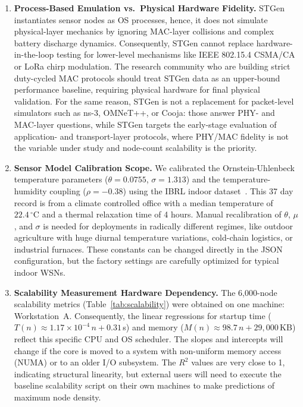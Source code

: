 \documentclass[jsan,article,submit,moreauthors,pdftex]{Definitions/mdpi}
\begin{document}
\begin{enumerate}

\item \textbf{Process-Based Emulation vs.\ Physical Hardware Fidelity.}
STGen instantiates sensor nodes as OS processes, hence, it does not simulate physical-layer mechanics by ignoring MAC-layer collisions and complex battery discharge dynamics. Consequently, STGen cannot replace hardware-in-the-loop testing for lower-level mechanisms like IEEE 802.15.4 CSMA/CA or {LoRa} chirp modulation. The research community who are building strict duty-cycled MAC protocols should treat STGen data as an upper-bound performance baseline, requiring physical hardware for final physical validation. For the same reason, STGen is not a replacement for packet-level simulators such as ns-3, OMNeT++, or Cooja: those answer PHY- and MAC-layer questions, while STGen targets the early-stage evaluation of application- and transport-layer protocols, where PHY/MAC fidelity is not the variable under study and node-count scalability is the priority.


\item \textbf{Sensor Model Calibration Scope.}
We calibrated the Ornstein-Uhlenbeck temperature
parameters ($\theta = 0.0755$, $\sigma = 1.313$) and the temperature-humidity coupling ($\rho = -0.38$) using the IBRL indoor dataset~\cite{intel-berkeley-lab}. This 37 day record is from a climate controlled office with a median temperature of $22.4\,^\circ\text{C}$ and a thermal relaxation time of 4 hours. Manual recalibration of $\theta$, $\mu$, and $\sigma$ is needed for deployments in radically different regimes, like outdoor agriculture with huge diurnal temperature variations, cold-chain logistics, or industrial furnaces. These constants can be changed directly in the JSON configuration, but the factory settings are carefully optimized for typical indoor WSNs.

\item \textbf{Scalability Measurement Hardware Dependency.}
The 6{,}000-node scalability metrics (Table~\ref{tab:scalability}) were obtained on one machine: Workstation~A. Consequently, the linear regressions for startup time ($T(n) \approx 1.17\times10^{-4}\,n + 0.31$\,s) and memory ($M(n) \approx 98.7\,n + 29{,}000$\,KB) reflect this specific CPU and OS scheduler. The slopes and intercepts will change if the core is moved to a system with non-uniform memory access (NUMA) or to an older I/O subsystem. The $R^2$ values are very close to 1, indicating structural linearity, but external users will need to execute the baseline scalability script on their own machines to make predictions of maximum node density.

\end{enumerate}
\end{document}
